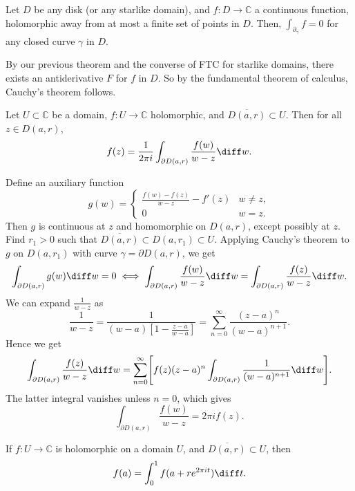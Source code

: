 \documentclass[12pt]{article}
\begin{document}
\begin{theorem}
	Let $D$ be any disk (or any starlike domain), and $f : D \to \mathbb{C}$ a continuous function, holomorphic away from at most a finite set of points in $D$. Then, $\int_{\partial_{\gamma}} f = 0$ for any closed curve $\gamma$ in $D$.
\end{theorem}

\begin{proofbox}
	By our previous theorem and the converse of FTC for starlike domains, there exists an antiderivative $F$ for $f$ in $D$. So by the fundamental theorem of calculus, Cauchy's theorem follows.
\end{proofbox}

\begin{theorem}
	Let $U \subset \mathbb{C}$ be a domain, $f : U \to \mathbb{C}$ holomorphic, and $\overline{D(a, r)} \subset U$. Then for all $z \in D(a, r)$,
	\[
	f(z) = \frac{1}{2 \pi i} \int_{\partial D(a, r)} \frac{f(w)}{w - z} \diff w
	.\]
\end{theorem}

\begin{proofbox}
	Define an auxiliary function
	\[
	g(w) = 
	\begin{cases}
		\frac{f(w) - f(z)}{w - z} - f'(z) & w \neq z, \\
		0 & w = z.
	\end{cases}
	\]
	Then $g$ is continuous at $z$ and homomorphic on $D(a, r)$, except possibly at $z$. Find $r_1 > 0$ such that $\overline{D(a,r)} \subset D(a, r_1) \subset U$. Applying Cauchy's theorem to $g$ on $D(a, r_1)$ with curve $\gamma = \partial D(a, r)$, we get
	\[
	\int_{\partial D(a, r)}g(w) \diff w = 0 \iff \int_{\partial D(a,r)}\frac{f(w)}{w - z} \diff w = \int_{\partial D(a, r)} \frac{f(z)}{w - z} \diff w
	.\]
	We can expand $\frac{1}{w - z}$ as
	\[
		\frac{1}{w - z} = \frac{1}{(w - a)[1 - \frac{z - a}{w - a}]} = \sum_{n = 0}^{\infty} \frac{(z - a)^{n}}{(w - a)^{n+1}}
	.\]
	Hence we get
	\[
		\int_{\partial D(a, r)}\frac{f(z)}{w - z} \diff w = \sum_{n = 0}^{\infty} \Biggl[ f(z) (z - a)^{n} \int_{\partial D(a, r)} \frac{1}{(w - a)^{n+1}} \diff w \Biggr]
	.\]
	The latter integral vanishes unless $n = 0$, which gives
	\[
	\int_{\partial D(a, r)} \frac{f(w)}{w - z} = 2 \pi i f(z)
	.\]
\end{proofbox}

\begin{corollary}
	If $f : U \to \mathbb{C}$ is holomorphic on a domain $U$, and $\overline{D(a, r)} \subset U$, then
	\[
	f(a) = \int_{0}^{1} f(a + re^{2 \pi i t}) \diff t
	.\]
\end{corollary}
\end{document}

